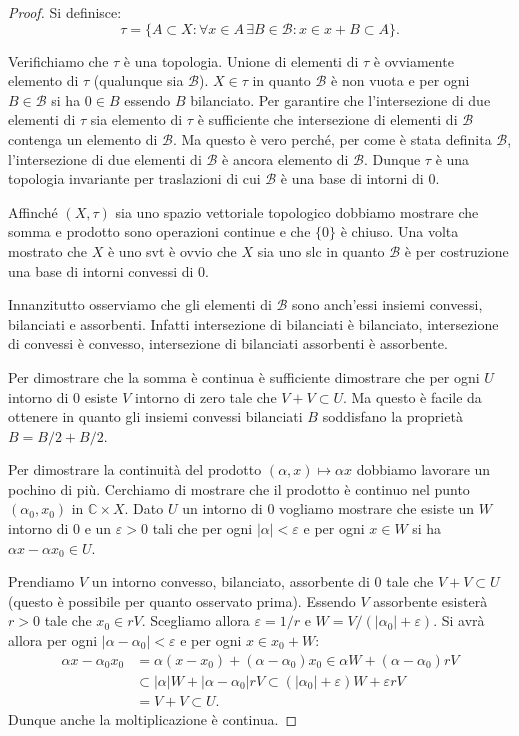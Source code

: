 \documentclass[italian,a4paper,oneside,headinclude]{scrbook}
\newcommand{\eps}{\varepsilon}
\newcommand{\B}{\mathcal B}
\newcommand{\CC}{\mathbb C}
\newcommand{\abs}[1]{{\left|#1\right|}}
\begin{document}
\begin{proof}
  Si definisce:
  \[
  \tau = \{ A \subset X \colon \forall x \in A\, \exists B \in \B
  \colon x \in x+ B \subset A\}.
  \]

  Verifichiamo che $\tau$ è una topologia. Unione di elementi di
  $\tau$ è ovviamente elemento di $\tau$ (qualunque sia $\B$).
  $X \in \tau$ in quanto $\B$ è non vuota e per ogni $B\in \B$ si ha $0\in B$
  essendo $B$ bilanciato.
  Per garantire che l'intersezione di due elementi di $\tau$ sia
  elemento di $\tau$ è sufficiente che intersezione di elementi di
  $\B$ contenga un elemento di $\B$. Ma questo è vero perché, per come
  è stata definita $\B$, l'intersezione di due elementi di $\B$ è ancora
  elemento di $\B$.
  Dunque $\tau$ è una topologia invariante per traslazioni di cui $\B$
  è una base di intorni di $0$.

  Affinché $(X,\tau)$ sia uno spazio vettoriale topologico dobbiamo
  mostrare che somma e prodotto sono operazioni continue e che $\{0\}$
  è chiuso. Una volta mostrato che $X$ è uno svt è ovvio che $X$ sia
  uno slc in quanto $\B$ è per costruzione una base di intorni
  convessi di $0$.

  Innanzitutto osserviamo che gli elementi di $\B$ sono anch'essi
  insiemi convessi, bilanciati e assorbenti. Infatti intersezione di
  bilanciati è bilanciato, intersezione di convessi è convesso,
  intersezione di bilanciati assorbenti è assorbente.

  Per dimostrare che la somma è continua è sufficiente dimostrare che
  per ogni $U$ intorno di $0$ esiste $V$ intorno di zero tale che
  $V+V\subset U$. Ma questo è facile da ottenere in quanto gli insiemi
  convessi bilanciati $B$ soddisfano la proprietà $B = B/2 + B/2$.

  Per dimostrare la continuità del prodotto $(\alpha,x)\mapsto \alpha
  x$ dobbiamo lavorare un pochino di più. Cerchiamo di mostrare che il
  prodotto è continuo nel punto $(\alpha_0, x_0)$ in $\CC \times X$.
  Dato $U$ un intorno di $0$ vogliamo mostrare che esiste un $W$
  intorno di $0$ e un $\eps>0$ tali che per ogni $\abs{\alpha}<\eps$ e
  per ogni $x\in W$ si ha $\alpha x- \alpha x_0 \in U$.

  Prendiamo $V$ un intorno convesso, bilanciato, assorbente di $0$
  tale che $V+V \subset U$ (questo è
  possibile per quanto osservato prima).
  Essendo $V$ assorbente esisterà $r>0$ tale che $x_0\in r V$.
  Scegliamo allora $\eps = 1/r$ e $W=V/(\abs{\alpha_0}+\eps)$.
  Si avrà allora per ogni $\abs{\alpha-\alpha_0}<\eps$ e per ogni
  $x\in x_0 + W$:
  \begin{align*}
    \alpha x - \alpha_0 x_0
    &= \alpha(x-x_0) + (\alpha -\alpha_0) x_0
    \in \alpha W + (\alpha-\alpha_0) r V \\
    &\subset \abs{\alpha} W + \abs{\alpha-\alpha_0} r V
    \subset (\abs{\alpha_0} + \eps) W + \eps r V\\
    &= V + V \subset U.
  \end{align*}
  Dunque anche la moltiplicazione è continua.


\end{proof}
\end{document}
